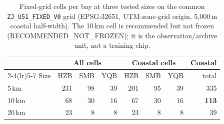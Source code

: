\begin{table}[t]
\centering
\small
\caption{Fixed-grid cells per bay at three tested sizes on the common
\texttt{ZJ\_U51\_FIXED\_V0} grid (EPSG:32651, UTM-zone-grid origin,
5{,}000\,m coastal half-width). The 10\,km cell is recommended but not
frozen (RECOMMENDED\_NOT\_FROZEN); it is the observation/archive unit,
not a training chip.}
\label{tab:grid}
\begin{tabular}{lrrrrrrr}
\toprule
 & \multicolumn{3}{c}{All cells} & \multicolumn{3}{c}{Coastal cells} & Coastal \\
\cmidrule(lr){2-4}\cmidrule(lr){5-7}
Size & HZB & SMB & YQB & HZB & SMB & YQB & total \\
\midrule
5\,km  & 231 & 98 & 39 & 201 & 95 & 39 & 335 \\
10\,km & 68  & 30 & 16 & 67  & 30 & 16 & \textbf{113} \\
20\,km & 23  & 8  & 8  & 23  & 8  & 8  & 39 \\
\bottomrule
\end{tabular}
\end{table}
